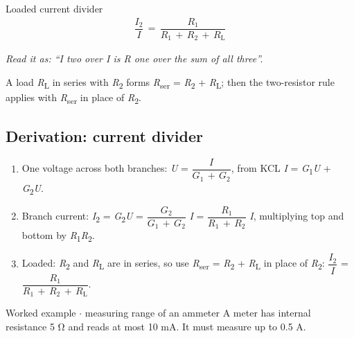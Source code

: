 \documentclass[11pt]{article}
\begin{document}
\begin{keepsection}
\begin{keepsection}
\begin{equationcard}{Loaded current divider}
\[ \begin{gathered} \dfrac{{I}_{2}}{{I}}\, =\, \dfrac{{R}_{1}}{{R}_{1}\, +\, {R}_{2}\, +\, {R}_{\mathrm{L}}} \end{gathered} \]
{\small \emph{Read it as: “I two over I is R one over the sum of all three”.}\par A load \textit{R}\textsubscript{L} in series with \textit{R}\textsubscript{2} forms \textit{R}\textsubscript{ser} = \textit{R}\textsubscript{2} + \textit{R}\textsubscript{L}; then the two-resistor rule applies with \textit{R}\textsubscript{ser} in place of \textit{R}\textsubscript{2}.}
\end{equationcard}
\end{keepsection}

\begin{keepsection}
\subsection{Derivation: current divider}

\begin{enumerate}
\item One voltage across both branches: \textit{U} = {\small\ensuremath{\dfrac{{I}}{{G}_{1}\, +\, {G}_{2}}}}, from KCL \textit{I} = \textit{G}\textsubscript{1}\textit{U} + \textit{G}\textsubscript{2}\textit{U}.
\item Branch current: \textit{I}\textsubscript{2} = \textit{G}\textsubscript{2}\textit{U} = {\small\ensuremath{\dfrac{{G}_{2}}{{G}_{1}\, +\, {G}_{2}}}} \textit{I} = {\small\ensuremath{\dfrac{{R}_{1}}{{R}_{1}\, +\, {R}_{2}}}} \textit{I}, multiplying top and bottom by \textit{R}\textsubscript{1}\textit{R}\textsubscript{2}.
\item Loaded: \textit{R}\textsubscript{2} and \textit{R}\textsubscript{L} are in series, so use \textit{R}\textsubscript{ser} = \textit{R}\textsubscript{2} + \textit{R}\textsubscript{L} in place of \textit{R}\textsubscript{2}: {\small\ensuremath{\dfrac{{I}_{2}}{{I}}}} = {\small\ensuremath{\dfrac{{R}_{1}}{{R}_{1}\, +\, {R}_{2}\, +\, {R}_{\mathrm{L}}}}}.
\end{enumerate}

\begin{workedbox}{Worked example \ensuremath{\cdot} measuring range of an ammeter}
A meter has internal resistance 5 Ω and reads at most 10 mA. It must measure up to 0.5 A.


\end{workedbox}
\end{keepsection}
\end{keepsection}
\end{document}
